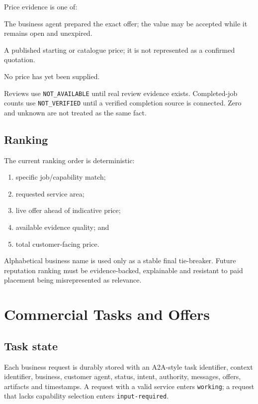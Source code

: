 \documentclass[11pt,a4paper]{article}
\newcommand{\code}[1]{\texttt{#1}}
\begin{document}
Price evidence is one of:

\begin{description}[style=nextline,leftmargin=18mm]
  \item[\code{LIVE\_OFFER}] The business agent prepared the exact offer; the
  value may be accepted while it remains open and unexpired.
  \item[\code{INDICATIVE\_CATALOGUE}] A published starting or catalogue price;
  it is not represented as a confirmed quotation.
  \item[\code{QUOTE\_PENDING}] No price has yet been supplied.
\end{description}

Reviews use \code{NOT\_AVAILABLE} until real review evidence exists.
Completed-job counts use \code{NOT\_VERIFIED} until a verified completion
source is connected.  Zero and unknown are not treated as the same fact.

\subsection{Ranking}

The current ranking order is deterministic:

\begin{enumerate}
  \item specific job/capability match;
  \item requested service area;
  \item live offer ahead of indicative price;
  \item available evidence quality; and
  \item total customer-facing price.
\end{enumerate}

Alphabetical business name is used only as a stable final tie-breaker.  Future
reputation ranking must be evidence-backed, explainable and resistant to paid
placement being misrepresented as relevance.

\section{Commercial Tasks and Offers}

\subsection{Task state}

Each business request is durably stored with an A2A-style task identifier,
context identifier, business, customer agent, status, intent, authority,
messages, offers, artifacts and timestamps.  A request with a valid service
enters \code{working}; a request that lacks capability selection enters
\code{input-required}.
\end{document}
